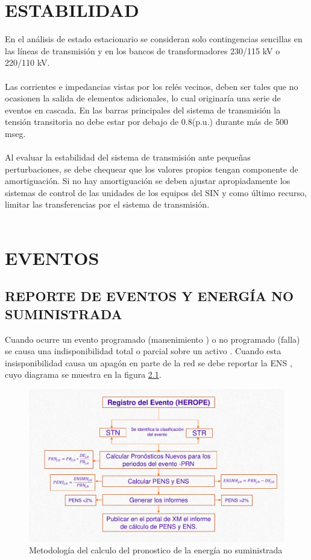 \documentclass[a5paper]{book}%
\begin{document}
\chapter{ESTABILIDAD}
 En el análisis de estado estacionario se consideran solo
  contingencias sencillas en las líneas de transmisión y en los bancos
  de transformadores 230/115 kV o 220/110 kV.\\\\
	
	
 Las corrientes e impedancias vistas por los relés vecinos, deben
  ser tales que no ocasionen la salida de elementos adicionales, lo
  cual originaría una serie de eventos en cascada.  En las barras
  principales del sistema de transmisión la tensión transitoria no
  debe estar por debajo de 0.8(p.u.) durante más de 500 mseg.\\\\
	
 Al evaluar la estabilidad del sistema de transmisión ante
  pequeñas perturbaciones, se debe chequear que los valores propios
  tengan componente de amortiguación. Si no hay amortiguación se deben
  ajustar apropiadamente los sistemas de control de las unidades de
  los equipos del SIN y como último recurso, limitar las
  transferencias por el sistema de transmisión.\\\\


                          \chapter{EVENTOS}

\section{REPORTE DE EVENTOS Y ENERGÍA NO SUMINISTRADA}

Cuando ocurre un evento programado (manenimiento ) o no programado (falla) se causa una
indisponibilidad total o parcial  sobre un activo \cite{CREG0942012}. Cuando esta
insisponibilidad causa un apagón en parte de la red se debe reportar la
 \ac{ENS} \cite{CREG0152018}, cuyo diagrama se muestra en la figura \ref{fig:ens}.

\begin{figure}[H]
  \centering
  \caption{Metodología del calculo del pronostico de la energía no
    suministrada}
  \label{fig:ens}
  \includegraphics[width=\linewidth]{calculo_ens.png}
\end{figure}
\end{document}
